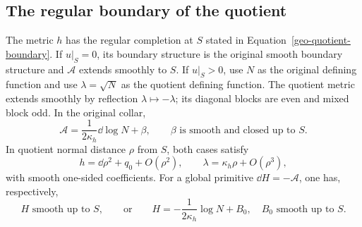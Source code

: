 \subsection{The regular boundary of the quotient}

\begin{lemma}
\label{geo-boundary-collars}
\label{geo-static-collar}
The metric $h$ has the regular completion at $S$ stated in
Equation~\eqref{geo-quotient-boundary}.  If $u|_S=0$, its boundary structure
is the original smooth boundary structure and $\mathcal A$ extends smoothly
to $S$.  If $u|_S>0$, use $N$ as the original defining function and use
$\lambda=\sqrt N$ as the quotient defining function.  The quotient metric
extends smoothly by reflection $\lambda\mapsto-\lambda$; its diagonal
blocks are even and mixed block odd.  In the original collar,
\begin{equation}
 \mathcal A=\frac1{2\kappa_h}\dd\log N+\beta,
 \qquad \beta\text{ is smooth and closed up to }S.
 \label{geo-positive-A-collar}
\end{equation}
In quotient normal distance $\rho$ from $S$, both cases satisfy
\begin{equation}
 h=\dd\rho^2+q_0+O(\rho^2),\qquad
 \lambda=\kappa_h\rho+O(\rho^3),
 \label{geo-normal-boundary-jets}
\end{equation}
with smooth one-sided coefficients.
For a global primitive $\dd H=-\mathcal A$, one has, respectively,
\begin{equation}
 H\text{ smooth up to }S,
 \qquad\text{or}\qquad
 H=-\frac1{2\kappa_h}\log N+B_0,
 \quad B_0\text{ smooth up to }S.
 \label{geo-time-collar}
\end{equation}
\end{lemma}
